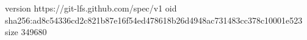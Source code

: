 version https://git-lfs.github.com/spec/v1
oid sha256:ad8c54336cd2c821b87e16f54ed478618b26d4948ac731483cc378c10001e523
size 349680
